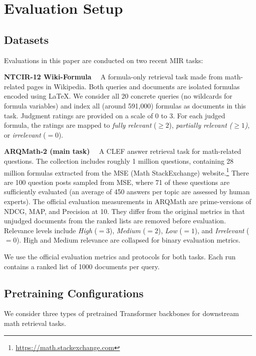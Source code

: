 \documentclass[11pt]{article}
\begin{document}
\section{Evaluation Setup}

\subsection{Datasets}

Evaluations in this paper are conducted on two recent MIR tasks:

\smallskip \noindent
\textbf{NTCIR-12 Wiki-Formula}~\cite{zanibbi2016ntcir} \ A formula-only retrieval task made from math-related pages in Wikipedia.
Both queries and documents are isolated formulas encoded using \LaTeX{}.
We consider all 20 concrete queries (no wildcards for formula variables) and index all (around 591,000) formulas as documents in this task.
Judgment ratings are provided on a scale of 0 to 3.
For each judged formula,
the ratings are mapped to
\textit{fully relevant} ($\ge 2$), \textit{partially relevant ($\ge 1$)}, or \textit{irrelevant} ($= 0$).

\smallskip \noindent
\textbf{ARQMath-2 (main task)}~\cite{mansouri2021arqmath2review} \ A CLEF answer retrieval task for math-related questions.
The collection includes roughly 1 million questions, containing 28 million formulas extracted from the MSE (Math StackExchange) website.\footnote{\url{https://math.stackexchange.com}}
There are 100 question posts sampled from MSE, where 71 of these questions are sufficiently evaluated (an average of 450 answers per topic are assessed by human experts). The official evaluation measurements in ARQMath are prime-versions of NDCG, MAP, and Precision at 10.
They differ from the original metrics in that unjudged documents from the ranked lists are removed before evaluation.
Relevance levels include \textit{High} ($=3$), \textit{Medium} ($=2$), \textit{Low} ($=1$), and \textit{Irrelevant} ($=0$).
High and Medium relevance are collapsed for binary evaluation metrics.

\medskip \noindent We use the official evaluation metrics and protocols for both tasks.
Each run contains a ranked list of 1000 documents per query.

\subsection{Pretraining Configurations}

We consider three types of pretrained Transformer backbones for downstream math retrieval tasks.
\end{document}
